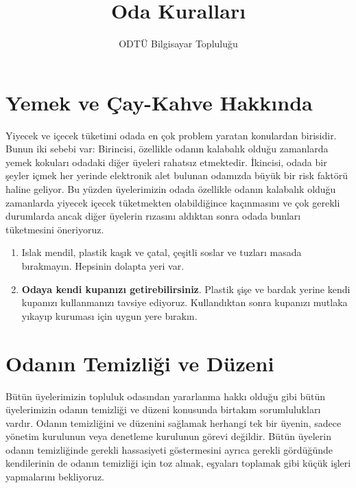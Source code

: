 \documentclass{article}
\title{Oda Kuralları}
\author{ODTÜ Bilgisayar Topluluğu}
\begin{document}
\maketitle

\section{Yemek ve Çay-Kahve Hakkında}

Yiyecek ve içecek tüketimi odada en çok problem yaratan konulardan birisidir. Bunun iki sebebi var: Birincisi, özellikle odanın kalabalık olduğu zamanlarda yemek kokuları odadaki diğer üyeleri rahatsız etmektedir. İkincisi, odada bir şeyler içmek her yerinde elektronik alet bulunan odamızda büyük bir risk faktörü haline geliyor. Bu yüzden üyelerimizin odada özellikle odanın kalabalık olduğu zamanlarda yiyecek içecek tüketmekten olabildiğince kaçınmasını ve çok gerekli durumlarda ancak diğer üyelerin rızasını aldıktan sonra odada bunları tüketmesini öneriyoruz.

\begin{enumerate}
	\item Islak mendil, plastik kaşık ve çatal, çeşitli soslar ve tuzları masada bırakmayın. Hepsinin dolapta yeri var. 
	\item \textbf{Odaya kendi kupanızı getirebilirsiniz}. Plastik şişe ve bardak yerine kendi kupanızı kullanmanızı tavsiye ediyoruz. Kullandıktan sonra kupanızı mutlaka yıkayıp kuruması için uygun yere bırakın.
\end{enumerate}

\section{Odanın Temizliği ve Düzeni}

Bütün üyelerimizin topluluk odasından yararlanma hakkı olduğu gibi bütün üyelerimizin odanın temizliği ve düzeni konusunda birtakım sorumlulukları vardır. Odanın temizliğini ve düzenini sağlamak herhangi tek bir üyenin, sadece yönetim kurulunun veya denetleme kurulunun görevi değildir. Bütün üyelerin odanın temizliğinde gerekli hassasiyeti göstermesini ayrıca gerekli gördüğünde kendilerinin de odanın temizliği için toz almak, eşyaları toplamak gibi küçük işleri yapmalarını bekliyoruz.
\end{document}
